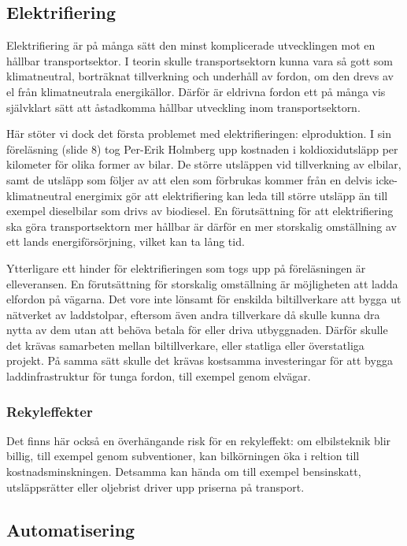 \documentclass{article}
\begin{document}
\subsection{Elektrifiering}

Elektrifiering är på många sätt den minst komplicerade utvecklingen mot en hållbar transportsektor. I teorin skulle transportsektorn kunna vara så gott som klimatneutral, borträknat tillverkning och underhåll av fordon, om den drevs av el från klimatneutrala energikällor. Därför är eldrivna fordon ett på många vis självklart sätt att åstadkomma hållbar utveckling inom transportsektorn.

Här stöter vi dock det första problemet med elektrifieringen: elproduktion. I sin föreläsning (slide 8) tog Per-Erik Holmberg upp kostnaden i koldioxidutsläpp per kilometer för olika former av bilar. De större utsläppen vid tillverkning av elbilar, samt de utsläpp som följer av att elen som förbrukas kommer från en delvis icke-klimatneutral energimix gör att elektrifiering kan leda till större utsläpp än till exempel dieselbilar som drivs av biodiesel. En förutsättning för att elektrifiering ska göra transportsektorn mer hållbar är därför en mer storskalig omställning av ett lands energiförsörjning, vilket kan ta lång tid.

Ytterligare ett hinder för elektrifieringen som togs upp på föreläsningen är elleveransen. En förutsättning för storskalig omställning är möjligheten att ladda elfordon på vägarna. Det vore inte lönsamt för enskilda biltillverkare att bygga ut nätverket av laddstolpar, eftersom även andra tillverkare då skulle kunna dra nytta av dem utan att behöva betala för eller driva utbyggnaden. Därför skulle det krävas samarbeten mellan biltillverkare, eller statliga eller överstatliga projekt. På samma sätt skulle det krävas kostsamma investeringar för att bygga laddinfrastruktur för tunga fordon, till exempel genom elvägar.

\subsubsection{Rekyleffekter}

Det finns här också en överhängande risk för en rekyleffekt: om elbilsteknik blir billig, till exempel genom subventioner, kan bilkörningen öka i reltion till kostnadsminskningen. Detsamma kan hända om till exempel bensinskatt, utsläppsrätter eller oljebrist driver upp priserna på transport.

\subsection{Automatisering}
\end{document}
